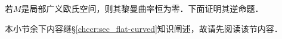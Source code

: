 

若$M$是局部广义欧氏空间，则其黎曼曲率恒为零．下面证明其逆命题．

本小节余下内容继\S\ref{chccr:sec_flat-curved}知识阐述，{\kaishu 故请先阅读该节内容}．



